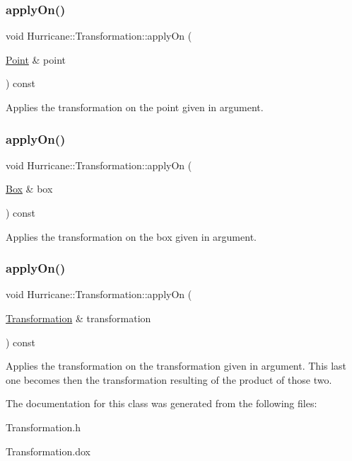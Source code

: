 \subsubsection{\texorpdfstring{apply\+On()}{applyOn()}\hspace{0.1cm}{\footnotesize\ttfamily [2/4]}}
{\footnotesize\ttfamily void Hurricane\+::\+Transformation\+::apply\+On (\begin{DoxyParamCaption}\item[{\mbox{\hyperlink{classHurricane_1_1Point}{Point}} \&}]{point }\end{DoxyParamCaption}) const}

Applies the transformation on the point given in argument. \mbox{\label{classHurricane_1_1Transformation_aa3ab2731934330107a3f2a3079f21132}} 
\subsubsection{\texorpdfstring{apply\+On()}{applyOn()}\hspace{0.1cm}{\footnotesize\ttfamily [3/4]}}
{\footnotesize\ttfamily void Hurricane\+::\+Transformation\+::apply\+On (\begin{DoxyParamCaption}\item[{\mbox{\hyperlink{classHurricane_1_1Box}{Box}} \&}]{box }\end{DoxyParamCaption}) const}

Applies the transformation on the box given in argument. \mbox{\label{classHurricane_1_1Transformation_a3ac2c40977ecf061b4316ecedc87918a}} 
\subsubsection{\texorpdfstring{apply\+On()}{applyOn()}\hspace{0.1cm}{\footnotesize\ttfamily [4/4]}}
{\footnotesize\ttfamily void Hurricane\+::\+Transformation\+::apply\+On (\begin{DoxyParamCaption}\item[{\mbox{\hyperlink{classHurricane_1_1Transformation}{Transformation}} \&}]{transformation }\end{DoxyParamCaption}) const}

Applies the transformation on the transformation given in argument. This last one becomes then the transformation resulting of the product of those two. 

The documentation for this class was generated from the following files\+:\begin{DoxyCompactItemize}
\item 
Transformation.\+h\item 
Transformation.\+dox\end{DoxyCompactItemize}
